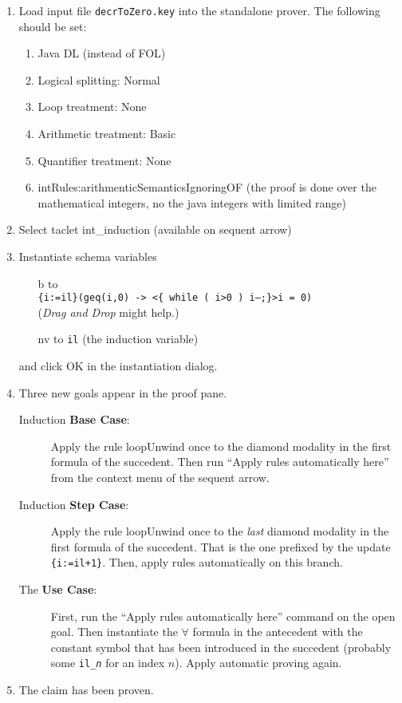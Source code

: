 \documentclass[11pt]{article}
\begin{document}
\begin{enumerate}
\item Load input file \texttt{decrToZero.key} into the standalone
  prover. The following should be set:
  \begin{enumerate}
  \item Java DL (instead of FOL)
  \item Logical splitting: Normal
  \item Loop treatment: None
  \item Arithmetic treatment: Basic
  \item Quantifier treatment: None
  \item intRules:arithmenticSemanticsIgnoringOF (the proof is done
    over the mathematical integers, no the java integers with limited
    range)
  \end{enumerate}

\item Select taclet \textsf{int\_induction} (available on sequent
  arrow)

\item Instantiate schema variables 
  \begin{itemize} 
  \item[\textsf{b}] to \\ \texttt{\{i:=il\}(geq(i,0) -> <\{ while
      ( i>0 )  i--;\}>i = 0)}\\
    (\emph{Drag and Drop} might help.)
  \item[\textsf{nv}] to \texttt{il} (the induction variable) 
  \end{itemize}
  and click \textsf{OK} in the instantiation dialog.


\item Three new goals appear in the proof pane.

  \begin{description}
  \item[Induction \textbf{Base Case}:] Apply the rule
    \textsf{loopUnwind} once to the diamond modality in the first
    formula of the succedent. Then run ``Apply rules automatically
    here'' from the context menu of the sequent arrow.

  \item[Induction \textbf{Step Case}:] Apply the rule
    \textsf{loopUnwind} once to the \emph{last} diamond modality in
    the first formula of the succedent. That is the one prefixed by
    the update \texttt{\{i:=il+1\}}. Then, apply rules automatically on this
    branch.

  \item[The \textbf{Use Case}:] First, run the ``Apply rules
    automatically here'' command on the open goal. Then instantiate
    the $\forall$ formula in the antecedent with the constant symbol
    that has been introduced in the succedent (probably some
    \texttt{il\_{\it n}} for an index $n$). Apply automatic proving
    again.
  \end{description}

\item The claim has been proven.

\end{enumerate}
\end{document}
